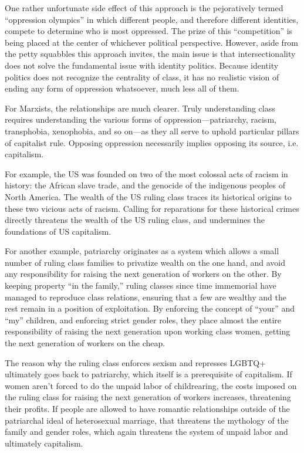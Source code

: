 One rather unfortunate side effect of this approach is the pejoratively termed ``oppression olympics'' in which different people, and therefore different identities, compete to determine who is most oppressed. The prize of this ``competition'' is being placed at the center of whichever political perspective. However, aside from the petty squabbles this approach invites, the main issue is that intersectionality does not solve the fundamental issue with identity politics. Because identity politics does not recognize the centrality of class, it has no realistic vision of ending any form of oppression whatsoever, much less all of them.

For Marxists, the relationships are much clearer. Truly understanding class requires understanding the various forms of oppression---patriarchy, racism, transphobia, xenophobia, and so on---as they all serve to uphold particular pillars of capitalist rule. Opposing oppression necessarily implies opposing its source, i.e. capitalism.

For example, the US was founded on two of the most colossal acts of racism in history: the African slave trade, and the genocide of the indigenous peoples of North America. The wealth of the US ruling class traces its historical origins to these two vicious acts of racism. Calling for reparations for these historical crimes directly threatens the wealth of the US ruling class, and undermines the foundations of US capitalism.

For another example, patriarchy originates as a system which allows a small number of ruling class families to privatize wealth on the one hand, and avoid any responsibility for raising the next generation of workers on the other. By keeping property ``in the family,'' ruling classes since time immemorial have managed to reproduce class relations, ensuring that a few are wealthy and the rest remain in a position of exploitation. By enforcing the concept of ``your'' and ``my'' children, and enforcing strict gender roles, they place almost the entire responsibility of raising the next generation upon working class women, getting the next generation of workers on the cheap.

The reason why the ruling class enforces sexism and represses LGBTQ+ ultimately goes back to patriarchy, which itself is a prerequisite of capitalism. If women aren't forced to do the unpaid labor of childrearing, the costs imposed on the ruling class for raising the next generation of workers increases, threatening their profits. If people are allowed to have romantic relationships outside of the patriarchal ideal of heterosexual marriage, that threatens the mythology of the family and gender roles, which again threatens the system of unpaid labor and ultimately capitalism.

